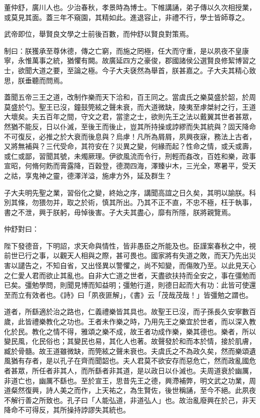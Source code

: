 
\begin{pinyinscope}
董仲舒，廣川人也。少治春秋，孝景時為博士。下帷講誦，弟子傳以久次相授業，或莫見其面。蓋三年不窺園，其精如此。進退容止，非禮不行，學士皆師尊之。

武帝即位，舉賢良文學之士前後百數，而仲舒以賢良對策焉。

制曰：朕獲承至尊休德，傳之亡窮，而施之罔極，任大而守重，是以夙夜不皇康寧，永惟萬事之統，猶懼有闕。故廣延四方之豪俊，郡國諸侯公選賢良修絜博習之士，欲聞大道之要，至論之極。今子大夫褎然為舉首，朕甚嘉之。子大夫其精心致思，朕垂聽而問焉。

蓋聞五帝三王之道，改制作樂而天下洽和，百王同之。當虞氏之樂莫盛於韶，於周莫盛於勺。聖王已沒，鐘鼓筦絃之聲未衰，而大道微缺，陵夷至虖桀紂之行，王道大壞矣。夫五百年之間，守文之君，當塗之士，欲則先王之法以戴翼其世者甚眾，然猶不能反，日以仆滅，至後王而後止，豈其所持操或誖繆而失其統與？固天降命不可復反，必推之於大衰而後息與？烏虖！凡所為屑屑，夙興夜寐，務法上古者，又將無補與？三代受命，其符安在？災異之變，何緣而起？性命之情，或夭或壽，或仁或鄙，習聞其號，未燭厥理。伊欲風流而令行，刑輕而姦改，百姓和樂，政事宣昭，何脩何飭而膏露降，百穀登，德潤四海，澤臻屮木，三光全，寒暑平，受天之祜，享鬼神之靈，德澤洋溢，施虖方外，延及群生？

子大夫明先聖之業，習俗化之變，終始之序，講聞高誼之日久矣，其明以諭朕。科別其條，勿猥勿并，取之於術，慎其所出。乃其不正不直，不忠不極，枉于執事，書之不泄，興于朕躬，毋悼後害。子大夫其盡心，靡有所隱，朕將親覽焉。

仲舒對曰：

陛下發德音，下明詔，求天命與情性，皆非愚臣之所能及也。臣謹案春秋之中，視前世已行之事，以觀天人相與之際，甚可畏也。國家將有失道之敗，而天乃先出災害以譴告之，不知自省，又出怪異以警懼之，尚不知變，而傷敗乃至。以此見天心之仁愛人君而欲止其亂也。自非大亡道之世者，天盡欲扶持而全安之，事在彊勉而已矣。彊勉學問，則聞見博而知益明；彊勉行道，則德日起而大有功：此皆可使還至而立有效者也。《詩》曰「夙夜匪解」，《書》云「茂哉茂哉！」皆彊勉之謂也。

道者，所繇適於治之路也，仁義禮樂皆其具也。故聖王已沒，而子孫長久安寧數百歲，此皆禮樂教化之功也。王者未作樂之時，乃用先王之樂宜於世者，而以深入教化於民。教化之情不得，雅頌之樂不成，故王者功成作樂，樂其德也。樂者，所以變民風，化民俗也；其變民也易，其化人也著。故聲發於和而本於情，接於肌膚，臧於骨髓。故王道雖微缺，而筦絃之聲未衰也。夫虞氏之不為政久矣，然而樂頌遺風猶有存者，是以孔子在齊而聞韶也。夫人君莫不欲安存而惡危亡，然而政亂國危者甚眾，所任者非其人，而所繇者非其道，是以政日以仆滅也。夫周道衰於幽厲，非道亡也，幽厲不繇也。至於宣王，思昔先王之德，興滯補弊，明文武之功業，周道粲然復興，詩人美之而作，上天祐之，為生賢佐，後世稱誦，至今不絕。此夙夜不解行善之所致也。孔子曰「人能弘道，非道弘人」也。故治亂廢興在於己，非天降命不可得反，其所操持誖謬失其統也。


\end{pinyinscope}
